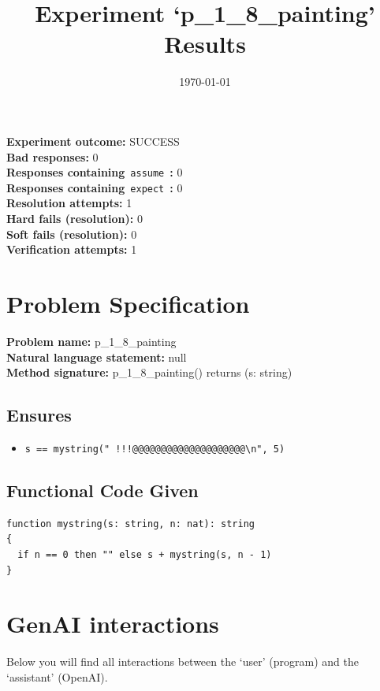 \documentclass{article}
\begin{document}
\title{Experiment `p\_1\_8\_painting' Results}
\author{\today}
\date{}
\maketitle
\textbf{Experiment outcome: }SUCCESS
\\\textbf{Bad responses: }0
\\\textbf{Responses containing}~\texttt{assume}~\textbf{: }0
\\\textbf{Responses containing}~\texttt{expect}~\textbf{: }0
\\\textbf{Resolution attempts: }1
\\\textbf{Hard fails (resolution): }0
\\\textbf{Soft fails (resolution): }0
\\\textbf{Verification attempts: }1
\section*{Problem Specification}
\textbf{Problem name: }p\_1\_8\_painting
\\\textbf{Natural language statement: }null
\\\textbf{Method signature: }p\_1\_8\_painting() returns (s: string)
\subsection*{Ensures}
\begin{itemize}
\item \texttt{s == mystring("          !!!@@@@@@@@@@@@@@@@@@@@\textbackslash{}n", 5)}
\end{itemize}
\subsection*{Functional Code Given}
\begin{lstlisting}
function mystring(s: string, n: nat): string
{
  if n == 0 then "" else s + mystring(s, n - 1)
}
\end{lstlisting}
\clearpage
\section*{GenAI interactions}
Below you will find all interactions between the `user' (program) and the `assistant' (OpenAI).
\end{document}
